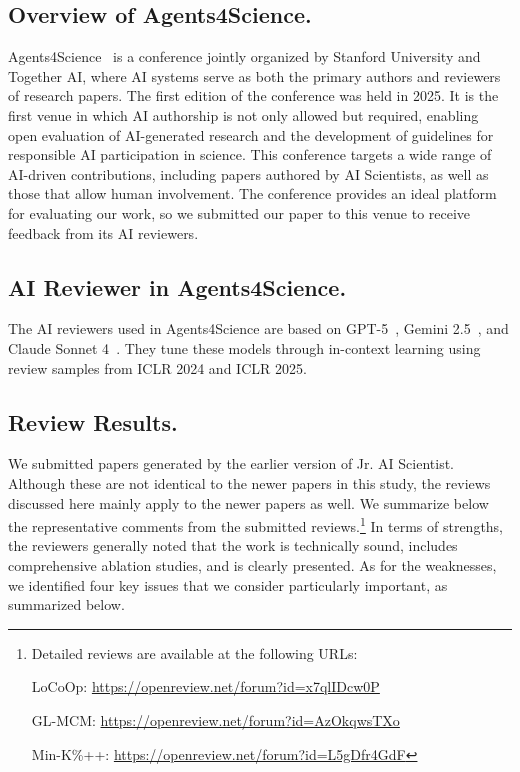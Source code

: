 \subsection{Overview of Agents4Science.}
Agents4Science~\citep{agents4science, bianchi2025exploring} is a conference jointly organized by Stanford University and Together AI, where AI systems serve as both the primary authors and reviewers of research papers. The first edition of the conference was held in 2025.
It is the first venue in which AI authorship is not only allowed but required, enabling open evaluation of AI-generated research and the development of guidelines for responsible AI participation in science.
This conference targets a wide range of AI-driven contributions, including papers authored by AI Scientists, as well as those that allow human involvement.
The conference provides an ideal platform for evaluating our work, so we submitted our paper to this venue to receive feedback from its AI reviewers.


\subsection{AI Reviewer in Agents4Science.}  
The AI reviewers used in Agents4Science are based on GPT-5~\citep{gpt5}, Gemini 2.5~\citep{gemini2.5pro}, and Claude Sonnet 4~\citep{anthropic2025claude4}.  
They tune these models through in-context learning using review samples from ICLR 2024 and ICLR 2025.

\subsection{Review Results.}
We submitted papers generated by the earlier version of Jr. AI Scientist. Although these are not identical to the newer papers in this study, the reviews discussed here mainly apply to the newer papers as well. We summarize below the representative comments from the submitted reviews.\footnote{Detailed reviews are available at the following URLs:

LoCoOp: \url{https://openreview.net/forum?id=x7qlIDcw0P}

GL-MCM: \url{https://openreview.net/forum?id=AzOkqwsTXo}

Min-K\%++: \url{https://openreview.net/forum?id=L5gDfr4GdF}}
In terms of strengths, the reviewers generally noted that the work is technically sound, includes comprehensive ablation studies, and is clearly presented.
As for the weaknesses, we identified four key issues that we consider particularly important, as summarized below.

